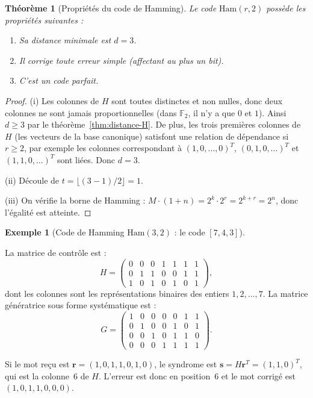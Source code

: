 \documentclass[12pt,a4paper,openany]{book}
\theoremstyle{definition}
\newtheorem{exemple}[definition]{Exemple}
\theoremstyle{plain}
\newtheorem{theoreme}[definition]{Théorème}
\theoremstyle{remark}
\begin{document}
\begin{theoreme}[Propriétés du code de Hamming]
\label{thm:hamming-proprietes}
Le code $\mathrm{Ham}(r, 2)$ possède les propriétés suivantes :
\begin{enumerate}[label=(\roman*)]
  \item Sa distance minimale est $d = 3$.
  \item Il corrige toute erreur simple (affectant au plus un bit).
  \item C'est un code parfait.
\end{enumerate}
\end{theoreme}

\begin{proof}
(i) Les colonnes de $H$ sont toutes distinctes et non nulles, donc deux
colonnes ne sont jamais proportionnelles (dans $\mathbb{F}_2$, il n'y a
que $0$ et $1$). Ainsi $d \geq 3$ par le théorème~\ref{thm:distance-H}.
De plus, les trois premières colonnes de $H$ (les vecteurs de la base
canonique) satisfont une relation de dépendance si $r \geq 2$, par
exemple les colonnes correspondant à $(1,0,\dots,0)^T$, $(0,1,0,\dots)^T$
et $(1,1,0,\dots)^T$ sont liées. Donc $d = 3$.

(ii) Découle de $t = \lfloor(3-1)/2\rfloor = 1$.

(iii) On vérifie la borne de Hamming :
$M \cdot (1 + n) = 2^k \cdot 2^r = 2^{k+r} = 2^n$, donc l'égalité est
atteinte.
\end{proof}

\begin{exemple}[{Code de Hamming $\mathrm{Ham}(3, 2)$ : le code $[7,4,3]$}]
\label{ex:hamming-7-4}

La matrice de contrôle est :
\[
  H = \begin{pmatrix}
    0 & 0 & 0 & 1 & 1 & 1 & 1 \\
    0 & 1 & 1 & 0 & 0 & 1 & 1 \\
    1 & 0 & 1 & 0 & 1 & 0 & 1
  \end{pmatrix},
\]
dont les colonnes sont les représentations binaires des entiers
$1, 2, \dots, 7$. La matrice génératrice sous forme systématique est :
\[
  G = \begin{pmatrix}
    1 & 0 & 0 & 0 & 0 & 1 & 1 \\
    0 & 1 & 0 & 0 & 1 & 0 & 1 \\
    0 & 0 & 1 & 0 & 1 & 1 & 0 \\
    0 & 0 & 0 & 1 & 1 & 1 & 1
  \end{pmatrix}.
\]

Si le mot reçu est $\mathbf{r} = (1,0,1,1,0,1,0)$, le syndrome est
$\mathbf{s} = H\mathbf{r}^T = (1,1,0)^T$, qui est la colonne~$6$ de $H$.
L'erreur est donc en position~$6$ et le mot corrigé est
$(1,0,1,1,0,0,0)$.
\end{exemple}
\end{document}
